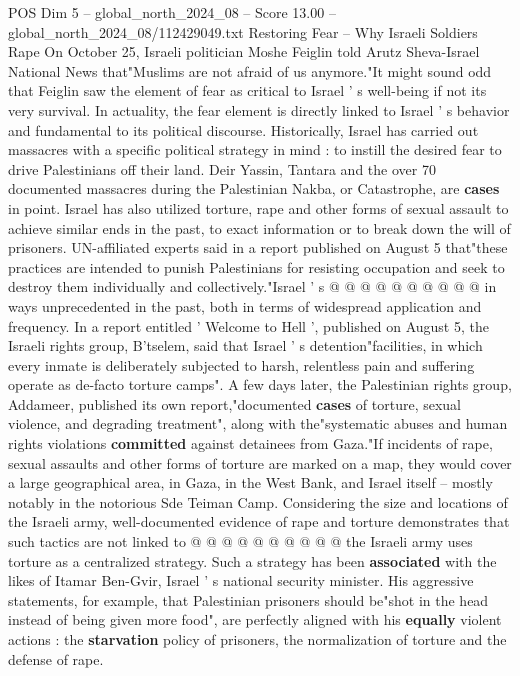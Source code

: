 \begin{textsample}{POS Dim 5 – global\_north\_2024\_08 – Score 13.00 – global\_north\_2024\_08/112429049.txt}  \label{ex:f5_pos_373}
Restoring Fear -- Why Israeli Soldiers Rape On October 25, Israeli politician Moshe Feiglin told Arutz Sheva-Israel National News that"Muslims are not afraid of us anymore."It might sound odd that Feiglin saw the element of fear as critical to Israel ' s well-being if not its very survival.
In actuality, the fear element is directly linked to Israel ' s behavior and fundamental to its political discourse.
Historically, Israel has carried out massacres with a specific political strategy in mind : to instill the desired fear to drive Palestinians off their land.
Deir Yassin, Tantara and the over 70 documented massacres during the Palestinian Nakba, or Catastrophe, are \textbf{cases} in point.
Israel has also utilized torture, rape and other forms of sexual assault to achieve similar ends in the past, to exact information or to break down the will of prisoners.
UN-affiliated experts said in a report published on August 5 that"these practices are intended to punish Palestinians for resisting occupation and seek to destroy them individually and collectively."Israel ' s @ @ @ @ @ @ @ @ @ @ in ways unprecedented in the past, both in terms of widespread application and frequency.
In a report entitled ' Welcome to Hell ', published on August 5, the Israeli rights group, B'tselem, said that Israel ' s detention"facilities, in which every inmate is deliberately subjected to harsh, relentless pain and suffering operate as de-facto torture camps".
A few days later, the Palestinian rights group, Addameer, published its own report,"documented \textbf{cases} of torture, sexual violence, and degrading treatment", along with the"systematic abuses and human rights violations \textbf{committed} against detainees from Gaza."If incidents of rape, sexual assaults and other forms of torture are marked on a map, they would cover a large geographical area, in Gaza, in the West Bank, and Israel itself -- mostly notably in the notorious Sde Teiman Camp.
Considering the size and locations of the Israeli army, well-documented evidence of rape and torture demonstrates that such tactics are not linked to @ @ @ @ @ @ @ @ @ @ the Israeli army uses torture as a centralized strategy.
Such a strategy has been \textbf{associated} with the likes of Itamar Ben-Gvir, Israel ' s national security minister.
His aggressive statements, for example, that Palestinian prisoners should be"shot in the head instead of being given more food", are perfectly aligned with his \textbf{equally} violent actions : the \textbf{starvation} policy of prisoners, the normalization of torture and the defense of rape.

\end{textsample}
